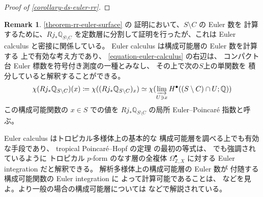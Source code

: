\documentclass[a4paper,dvipdfmx,reqno,12pt]{amsart}
\theoremstyle{definition}
\newtheorem{example}[theorem]{Example}
\newtheorem{remark}[theorem]{Remark}
\newcommand{\deq}{\coloneqq}
\newcommand{\opn}[1]{\operatorname{#1}}
\numberwithin{equation}{section}
\begin{document}
\begin{proof}[{Proof of \cref{corollary-ds-euler-rr}}]
 
\end{proof}

\begin{remark}
\cref{theorem-rr-euler-surface} の
証明において、$S\setminus C$ の Euler 数を
計算するために、$Rj_*\mathbb{Q}_{S\setminus C}$
を定数層に分割して証明を行ったが、これは
Euler calculus と密接に関係している\cite{MR970076,MR1115569}。
Euler calculus は構成可能層の Euler 数を計算する
上で有効な考え方であり、
\cref{equation-euler-calculus} の右辺は、
コンパクト台 Euler 標数を符号付き測度の一種とみなし、
その上で次の$S$上の単関数を
積分していると解釈することができる。
\begin{align}
\chi(Rj_*\mathbb{Q}_{S\setminus C})(x)\deq \chi((Rj_*\mathbb{Q}_{S\setminus C})_x) 
\simeq \chi(\varinjlim_{U\ni x} H^{\bullet}((S\setminus C)
\cap U;\mathbb{Q}))   
\end{align}
この構成可能関数の $x\in S$ での値を
$Rj_*\mathbb{Q}_{S\setminus C}$
の局所 Euler--Poincar\'e 指数と呼ぶ。

Euler calculus はトロピカル多様体上の基本的な
構成可能層を調べる上でも有効な手段であり、
tropical Poincar\'e--Hopf の定理
\cite[Theorem 4.7]{MR4540954} の最初の等式は、
\cite[Remark 4.8]{MR4540954} でも強調されているように
トロピカル $p$-form のなす層の全複体 
$\Omega^{\bullet}_{\mathbb{Z},X}$ に対する Euler integration 
だと解釈できる。
解析多様体上の構成可能層の Euler 数が
付随する構成可能関数の Euler integration に
よって計算可能であることは、\cite[Theorem 9.7.1]{MR1299726}
などを見よ。より一般の場合の構成可能層については
\cite[Chapter 2]{MR2031639} などで解説されている。
\end{remark}

\end{document}
